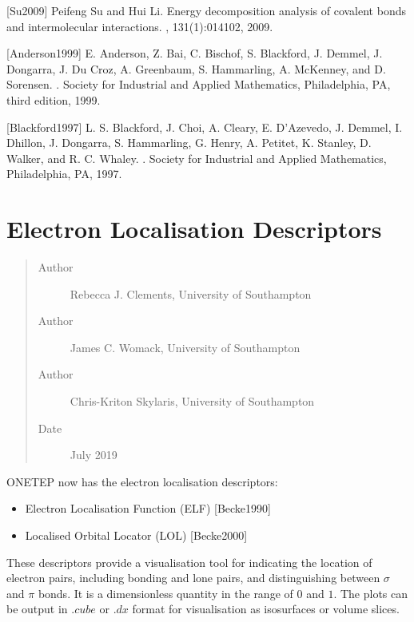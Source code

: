 \documentclass[letterpaper,10pt,english]{sphinxmanual}
\begin{document}
{[}Su2009{]} Peifeng Su and Hui Li. Energy decomposition analysis of covalent bonds and intermolecular interactions. , 131(1):014102, 2009.

{[}Anderson1999{]} E. Anderson, Z. Bai, C. Bischof, S. Blackford, J. Demmel, J. Dongarra, J. Du Croz, A. Greenbaum, S. Hammarling, A. McKenney, and D. Sorensen. . Society for Industrial and Applied Mathematics, Philadelphia, PA, third edition, 1999.

{[}Blackford1997{]} L. S. Blackford, J. Choi, A. Cleary, E. D’Azevedo, J. Demmel, I. Dhillon, J. Dongarra, S. Hammarling, G. Henry, A. Petitet, K. Stanley, D. Walker, and R. C. Whaley. . Society for Industrial and Applied Mathematics, Philadelphia, PA, 1997.


\section{Electron Localisation Descriptors}
\label{\detokenize{eld:electron-localisation-descriptors}}\label{\detokenize{eld::doc}}\begin{quote}\begin{description}
\item[{Author}] \leavevmode
Rebecca J. Clements, University of Southampton

\item[{Author}] \leavevmode
James C. Womack, University of Southampton

\item[{Author}] \leavevmode
Chris-Kriton Skylaris, University of Southampton

\item[{Date}] \leavevmode
July 2019

\end{description}\end{quote}

ONETEP now has the electron localisation descriptors:
\begin{itemize}
\item {} 
Electron Localisation Function (ELF) {[}Becke1990{]}

\item {} 
Localised Orbital Locator (LOL) {[}Becke2000{]}

\end{itemize}

These descriptors provide a visualisation tool for indicating the
location of electron pairs, including bonding and lone pairs, and
distinguishing between \(\sigma\) and \(\pi\) bonds. It is a
dimensionless quantity in the range of \(0\) and \(1\). The
plots can be output in \(.cube\) or \(.dx\) format for
visualisation as isosurfaces or volume slices.
\end{document}
